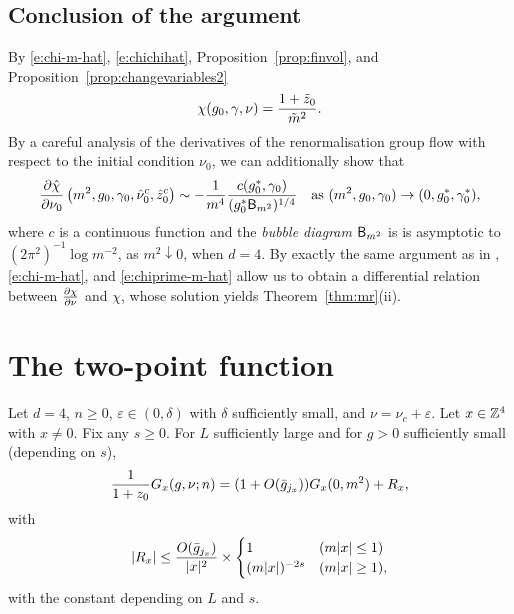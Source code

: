 \subsection{Conclusion of the argument}

By \eqref{e:chi-m-hat}, \eqref{e:chichihat}, Proposition~\ref{prop:finvol},
and Proposition~\ref{prop:changevariables2}
\begin{equation}
\chi(g_0, \gamma, \nu)
	=
\frac{1 + \tilde z_0}{\tilde m^2}.
\end{equation}
By a careful analysis of the derivatives of the renormalisation group flow with
respect to the initial condition $\nu_0$, we can additionally show that
\begin{equation}
\label{e:chiprime-m-hat}
\frac{\partial \hat\chi}{\partial \nu_0} \left(m^2,g_0, \gamma_0,\hat\nu_0^c, \hat z_0^c \right)
	\sim
-\frac{1}{m^4} \frac{c(g_0^*, \gamma_0)}{(g_0^*{\sf B}_{m^2})^{1/4}}
	\quad
\text{as $(m^2,g_0,\gamma_0) \rightarrow (0,g_0^*,\gamma_0^*)$},
\end{equation}
where $c$ is a continuous function
and the \emph{bubble diagram} ${\sf B}_{m^2}$ is
is asymptotic to $(2\pi^2)^{-1} \log m^{-2}$, as $m^2 \downarrow 0$, when $d = 4$.
By exactly the same argument as in \cite[Section~\ref{log-sec:pfsuscept}]{BBS-saw4-log},
\eqref{e:chi-m-hat}, and \eqref{e:chiprime-m-hat} allow us to obtain
a differential relation between $\frac{\partial \chi}{\partial \nu}$ and $\chi$,
whose solution yields Theorem~\ref{thm:mr}(ii).


\section{The two-point function}

\begin{prop}\label{prop:R}
Let $d=4$, $n \ge 0$, $\varepsilon \in (0,\delta)$ with $\delta$ sufficiently small,
and $\nu = \nu_c + \varepsilon$.
Let $x \in {\mathbb Z}^4$ with $x \neq 0$.
Fix any $s \geq 0$.
For $L$ sufficiently large and for $g > 0$ sufficiently small (depending on $s$),
\begin{equation}
\frac{1}{1+z_0} G_x(g, \nu; n) = (1 + O(\bar{g}_{j_x})) G_x(0, m^2) + R_x,
\end{equation}
with
\begin{equation}\label{e:Rab-bound}
|R_{x}|
\le
\frac{ O(\bar{g}_{j_{x}}) }{|x|^2}
\times
\begin{cases}
    1 & (m|x|\le 1)
    \\
    (m|x|)^{-2s} & (m|x|\ge 1),
\end{cases}
\end{equation}
with the  constant depending on $L$ and $s$.
\end{prop}

